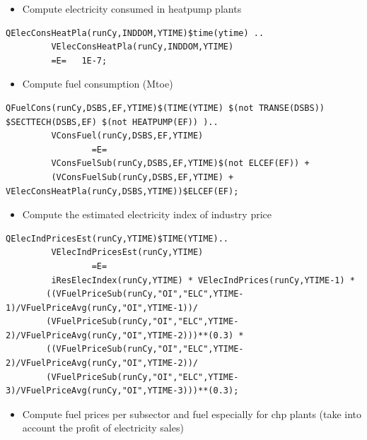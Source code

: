 \documentclass[a4paper,]{scrartcl}
\providecommand{\tightlist}{%
  \setlength{\itemsep}{0pt}\setlength{\parskip}{0pt}}
\begin{document}
\begin{itemize}
\tightlist
\item
  Compute electricity consumed in heatpump plants
\end{itemize}

\begin{lstlisting}
QElecConsHeatPla(runCy,INDDOM,YTIME)$time(ytime) ..
         VElecConsHeatPla(runCy,INDDOM,YTIME)
         =E=   1E-7;
\end{lstlisting}

\begin{itemize}
\tightlist
\item
  Compute fuel consumption (Mtoe)
\end{itemize}

\begin{lstlisting}
QFuelCons(runCy,DSBS,EF,YTIME)$(TIME(YTIME) $(not TRANSE(DSBS)) $SECTTECH(DSBS,EF) $(not HEATPUMP(EF)) )..
         VConsFuel(runCy,DSBS,EF,YTIME)
                 =E=
         VConsFuelSub(runCy,DSBS,EF,YTIME)$(not ELCEF(EF)) + 
         (VConsFuelSub(runCy,DSBS,EF,YTIME) + VElecConsHeatPla(runCy,DSBS,YTIME))$ELCEF(EF);
\end{lstlisting}

\begin{itemize}
\tightlist
\item
  Compute the estimated electricity index of industry price
\end{itemize}

\begin{lstlisting}
QElecIndPricesEst(runCy,YTIME)$TIME(YTIME)..
         VElecIndPricesEst(runCy,YTIME)
                 =E=
         iResElecIndex(runCy,YTIME) * VElecIndPrices(runCy,YTIME-1) *
        ((VFuelPriceSub(runCy,"OI","ELC",YTIME-1)/VFuelPriceAvg(runCy,"OI",YTIME-1))/
        (VFuelPriceSub(runCy,"OI","ELC",YTIME-2)/VFuelPriceAvg(runCy,"OI",YTIME-2)))**(0.3) *
        ((VFuelPriceSub(runCy,"OI","ELC",YTIME-2)/VFuelPriceAvg(runCy,"OI",YTIME-2))/
        (VFuelPriceSub(runCy,"OI","ELC",YTIME-3)/VFuelPriceAvg(runCy,"OI",YTIME-3)))**(0.3);
\end{lstlisting}

\begin{itemize}
\tightlist
\item
  Compute fuel prices per subsector and fuel especially for chp plants
  (take into account the profit of electricity sales)
\end{itemize}
\end{document}

